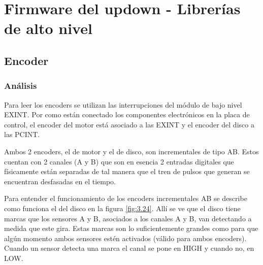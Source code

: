 \section{Firmware del updown - Librerías de alto nivel} \label{sec:\thesection}

\subsection{Encoder}
\subsubsection{Análisis}
Para leer los encoders se utilizan las interrupciones del módulo de bajo nivel EXINT. Por como están conectado los componentes electrónicos en la placa de control, el encoder del motor está asociado a las EXINT y el encoder del disco a las PCINT.

Ambos 2 encoders, el de motor y el de disco, son incrementales de tipo AB. Estos cuentan con 2 canales (A y B) que son en esencia 2 entradas digitales que físicamente están separadas de tal manera que el tren de pulsos que generan se encuentran desfasadas en el tiempo. 

Para entender el funcionamiento de los encoders incrementales AB se describe como funciona el del disco en la figura \ref{fig:3.24}. Allí se ve que el disco tiene marcas que los sensores A y B, asociados a los canales A y B, van detectando a medida que este gira. Estas marcas son lo suficientemente grandes como para que algún momento ambos sensores estén activados (válido para ambos encoders). Cuando un sensor detecta una marca el canal se pone en HIGH y cuando no, en LOW.

